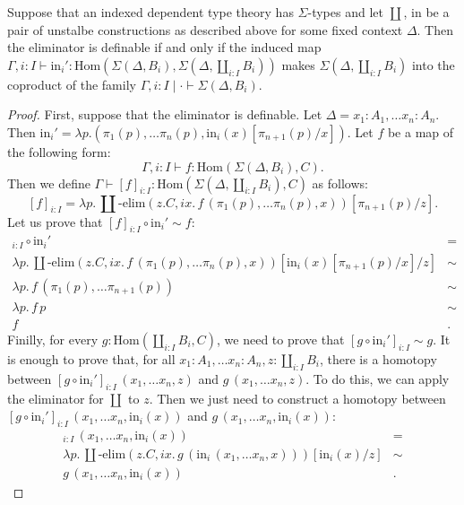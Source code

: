 \documentclass[reqno]{amsart}
\theoremstyle{definition}
\theoremstyle{remark}
\newcommand{\fs}[1]{\mathrm{#1}}
\newcommand{\Hom}{\fs{Hom}}
\numberwithin{figure}{section}
\begin{document}
\begin{lem}
Suppose that an indexed dependent type theory has $\Sigma$-types and let $\coprod$, $\fs{in}$ be a pair of unstalbe constructions as described above for some fixed context $\Delta$.
Then the eliminator is definable if and only if the induced map $\Gamma, i : I \vdash \fs{in}_i' : \Hom(\Sigma(\Delta,B_i), \Sigma(\Delta, \coprod_{i : I} B_i))$ makes $\Sigma(\Delta, \coprod_{i : I} B_i)$ into the coproduct of the family $\Gamma, i : I \mid \cdot \vdash \Sigma(\Delta,B_i)$.
\end{lem}
\begin{proof}
First, suppose that the eliminator is definable.
Let $\Delta = x_1 : A_1, \ldots x_n : A_n$.
Then $\fs{in}_i' = \lambda p.(\pi_1(p), \ldots \pi_n(p), \fs{in}_i(x)[\pi_{n+1}(p)/x])$.
Let $f$ be a map of the following form:
\[ \Gamma, i : I \vdash f : \Hom(\Sigma(\Delta,B_i),C). \]
Then we define $\Gamma \vdash [f]_{i : I} : \Hom(\Sigma(\Delta, \coprod_{i : I} B_i), C)$ as follows:
\[ [f]_{i : I} = \lambda p.\,\coprod\text{-}\fs{elim}(z.C, i x.\,f\,(\pi_1(p), \ldots \pi_n(p), x))[\pi_{n+1}(p)/z]. \]
Let us prove that $[f]_{i : I} \circ \fs{in}_i' \sim f$:
\begin{align*}
[f]_{i : I} \circ \fs{in}_i' & = \\
\lambda p.\,\coprod\text{-}\fs{elim}(z.C, i x.\,f\,(\pi_1(p), \ldots \pi_n(p), x))[\fs{in}_i(x)[\pi_{n+1}(p)/x]/z] & \sim \\
\lambda p.\,f\,(\pi_1(p), \ldots \pi_{n+1}(p)) & \sim \\
\lambda p.\,f\,p & \sim \\
f & .
\end{align*}
Finilly, for every $g : \Hom(\coprod_{i : I} B_i, C)$, we need to prove that $[g \circ \fs{in}_i']_{i : I} \sim g$.
It is enough to prove that, for all $x_1 : A_1, \ldots x_n : A_n, z : \coprod_{i : I} B_i$, there is a homotopy between $[g \circ \fs{in}_i']_{i : I}\,(x_1, \ldots x_n, z)$ and $g\,(x_1, \ldots x_n, z)$.
To do this, we can apply the eliminator for $\coprod$ to $z$.
Then we just need to construct a homotopy between $[g \circ \fs{in}_i']_{i : I}\,(x_1, \ldots x_n, \fs{in}_i(x))$ and $g\,(x_1, \ldots x_n, \fs{in}_i(x))$:
\begin{align*}
[g \circ \fs{in}_i']_{i : I}\,(x_1, \ldots x_n, \fs{in}_i(x)) & = \\
\lambda p.\,\coprod\text{-}\fs{elim}(z.C, i x.\,g\,(\fs{in}_i\,(x_1, \ldots x_n, x)))[\fs{in}_i(x)/z] & \sim \\
g\,(x_1, \ldots x_n, \fs{in}_i(x)) & .
\end{align*}


\end{proof}
\end{document}
